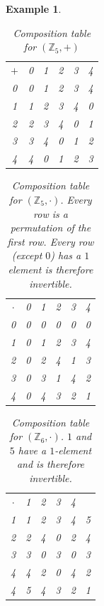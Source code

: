 \documentclass[a4paper,landscape,twocolumn]{article}
\newtheorem{ex}{Example}
\begin{document}
\begin{ex}
  \begin{table}[!ht]
    \begin{center}
      \begin{tabular}{c|ccccc}
        $+$ & 0 & 1 & 2 & 3 & 4 \\
          0 & 0 & 1 & 2 & 3 & 4 \\
          1 & 1 & 2 & 3 & 4 & 0 \\
          2 & 2 & 3 & 4 & 0 & 1 \\
          3 & 3 & 4 & 0 & 1 & 2 \\
          4 & 4 & 0 & 1 & 2 & 3
      \end{tabular}
      \caption{Composition table for $(\mathbb{Z}_5, +)$}
    \end{center}
  \end{table}
  \begin{table}[!ht]
    \begin{center}
      \begin{tabular}{c|ccccc}
        $\cdot$ & 0 & 1 & 2 & 3 & 4 \\
              0 & 0 & 0 & 0 & 0 & 0 \\
              1 & 0 & 1 & 2 & 3 & 4 \\
              2 & 0 & 2 & 4 & 1 & 3 \\
              3 & 0 & 3 & 1 & 4 & 2 \\
              4 & 0 & 4 & 3 & 2 & 1
      \end{tabular}
      \caption{
        Composition table for $(\mathbb{Z}_5, \cdot)$.
        Every row is a permutation of the first row.
        Every row (except $0$) has a $1$ element is therefore invertible.
      }
    \end{center}
  \end{table}
  \begin{table}[!ht]
    \begin{center}
      \begin{tabular}{c|ccccc}
        $\cdot$ & 1 & 2 & 3 & 4 \\
              1 & 1 & 2 & 3 & 4 & 5 \\
              2 & 2 & 4 & 0 & 2 & 4 \\
              3 & 3 & 0 & 3 & 0 & 3 \\
              4 & 4 & 2 & 0 & 4 & 2 \\
              4 & 5 & 4 & 3 & 2 & 1
      \end{tabular}
      \caption{
        Composition table for $(\mathbb{Z}_6, \cdot)$.
        $1$ and $5$ have a $1$-element and is therefore invertible.
      }
    \end{center}
  \end{table}


\end{ex}
\end{document}
